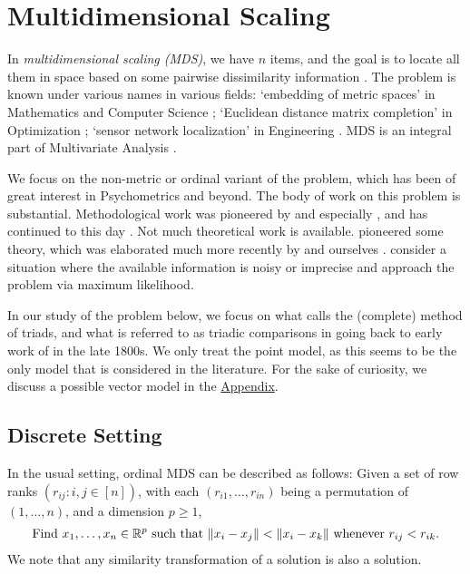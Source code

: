 \documentclass[twoside, 11pt]{article}
\begin{document}


\section{Multidimensional Scaling} 
\label{sec:mds}
In {\em multidimensional scaling (MDS)}, we have $n$ items, and the goal is to locate all them in space based on some pairwise dissimilarity information \cite{borg2005modern, cox2000multidimensional, young1987multidimensional}.  
The problem is known under various names in various fields:  `embedding of metric spaces' in Mathematics and Computer Science \cite{blumenthal1938distance}; `Euclidean distance matrix completion' in Optimization \cite{laurent2001matrix}; `sensor network localization' in Engineering \cite{priyantha2003anchor}. 
MDS is an integral part of Multivariate Analysis \cite{MVA, seber2009multivariate}.

We focus on the non-metric or ordinal variant of the problem, which has been of great interest in Psychometrics and beyond.
The body of work on this problem is substantial. Methodological work was pioneered by \citet{MR0173342,MR0140376} and especially \citet{kruskal1964nonmetric,kruskal1964multidimensional}, and has continued to this day \cite{terada2014local, mair2022more, anderton2019scaling, liu2016towards, agarwal2007generalized, van2012stochastic, tamuz2011adaptively}. 
Not much theoretical work is available. \citet{shepard1966metric} pioneered some theory, which was elaborated much more recently by \citet{klein} and ourselves \cite{arias2017some}. 
\citet{jain2016finite} consider a situation where the available information is noisy or imprecise and approach the problem via maximum likelihood. 

In our study of the problem below, we focus on what \citet{torgerson1952multidimensional} calls the (complete) method of triads, and what is referred to as triadic comparisons in \cite{DELEEUW1982285} going back to early work of \citet{stumpf1880} in the late 1800s. We only treat the point model, as this seems to be the only model that is considered in the literature. For the sake of curiosity, we discuss a possible vector model in the \hyperref[appendix]{Appendix}.

\subsection{Discrete Setting}
\label{sec:mds discrete}
In the usual setting, ordinal MDS can be described as follows: 
Given a set of row ranks $(r_{ij} : i, j \in [n])$, with each $(r_{i1}, \dots, r_{in})$ being a permutation of $(1, \dots, n)$, and a dimension $p \ge 1$, 
\begin{equation}\label{mds_discrete}
\begin{gathered}
\text{Find $x_1, \dots, x_n \in \mathbb{R}^p$ such that $\|x_i-x_j\| < \|x_i-x_k\|$ whenever $r_{ij} < r_{ik}$.}
\end{gathered}
\end{equation}
We note that any similarity transformation of a solution is also a solution.
\end{document}
